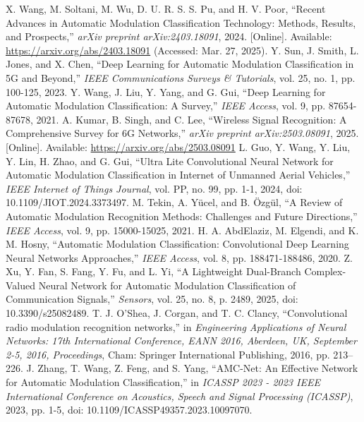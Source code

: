 \documentclass[conference]{IEEEtran}
\begin{document}
\begin{thebibliography}{00}

\bibitem{[5]} X. Wang, M. Soltani, M. Wu, D. U. R. S. S. Pu, and H. V. Poor, ``Recent Advances in Automatic Modulation Classification Technology: Methods, Results, and Prospects,'' \textit{arXiv preprint arXiv:2403.18091}, 2024. [Online]. Available: \url{https://arxiv.org/abs/2403.18091} (Accessed: Mar. 27, 2025).
\bibitem{[6]} Y. Sun, J. Smith, L. Jones, and X. Chen, ``Deep Learning for Automatic Modulation Classification in 5G and Beyond,'' \textit{IEEE Communications Surveys \& Tutorials}, vol. 25, no. 1, pp. 100-125, 2023.
\bibitem{[12]} Y. Wang, J. Liu, Y. Yang, and G. Gui, ``Deep Learning for Automatic Modulation Classification: A Survey,'' \textit{IEEE Access}, vol. 9, pp. 87654-87678, 2021.
\bibitem{[21]} A. Kumar, B. Singh, and C. Lee, ``Wireless Signal Recognition: A Comprehensive Survey for 6G Networks,'' \textit{arXiv preprint arXiv:2503.08091}, 2025. [Online]. Available: \url{https://arxiv.org/abs/2503.08091}
 L. Guo, Y. Wang, Y. Liu, Y. Lin, H. Zhao, and G. Gui, ``Ultra Lite Convolutional Neural Network for Automatic Modulation Classification in Internet of Unmanned Aerial Vehicles,'' \textit{IEEE Internet of Things Journal}, vol. PP, no. 99, pp. 1-1, 2024, doi: 10.1109/JIOT.2024.3373497.
\bibitem{[8]} M. Tekin, A. Yücel, and B. Özgül, ``A Review of Automatic Modulation Recognition Methods: Challenges and Future Directions,'' \textit{IEEE Access}, vol. 9, pp. 15000-15025, 2021.
\bibitem{[10]} H. A. AbdElaziz, M. Elgendi, and K. M. Hosny, ``Automatic Modulation Classification: Convolutional Deep Learning Neural Networks Approaches,'' \textit{IEEE Access}, vol. 8, pp. 188471-188486, 2020.
 Z. Xu, Y. Fan, S. Fang, Y. Fu, and L. Yi, ``A Lightweight Dual-Branch Complex-Valued Neural Network for Automatic Modulation Classification of Communication Signals,'' \textit{Sensors}, vol. 25, no. 8, p. 2489, 2025, doi: 10.3390/s25082489. %
 T. J. O'Shea, J. Corgan, and T. C. Clancy, ``Convolutional radio modulation recognition networks,'' in \textit{Engineering Applications of Neural Networks: 17th International Conference, EANN 2016, Aberdeen, UK, September 2-5, 2016, Proceedings}, Cham: Springer International Publishing, 2016, pp. 213--226. %
 J. Zhang, T. Wang, Z. Feng, and S. Yang, ``AMC-Net: An Effective Network for Automatic Modulation Classification,'' in \textit{ICASSP 2023 - 2023 IEEE International Conference on Acoustics, Speech and Signal Processing (ICASSP)}, 2023, pp. 1-5, doi: 10.1109/ICASSP49357.2023.10097070. %

\end{thebibliography}
\end{document}
